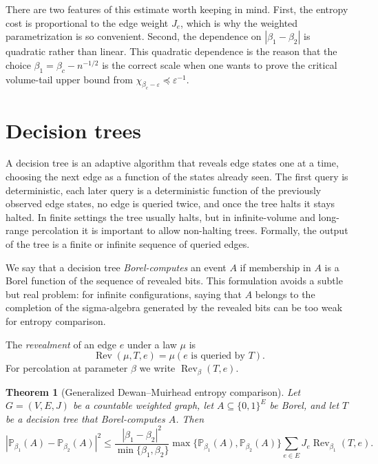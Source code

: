 \documentclass[11pt,reqno]{book}
\numberwithin{equation}{chapter}
\theoremstyle{plain}
\newtheorem{theorem}{Theorem}[chapter]
\theoremstyle{definition}
\theoremstyle{remark}
\renewcommand{\P}{\mathbb P}
\newcommand{\eps}{\varepsilon}
\newcommand{\1}{\mathbf 1}
\begin{document}
There are two features of this estimate worth keeping in mind. First, the entropy cost is proportional to the edge weight \(J_e\), which is why the weighted parametrization is so convenient. Second, the dependence on \(|\beta_1-\beta_2|\) is quadratic rather than linear. This quadratic dependence is the reason that the choice \(\beta_1=\beta_c-n^{-1/2}\) is the correct scale when one wants to prove the critical volume-tail upper bound from \(\chi_{\beta_c-\eps}\preceq \eps^{-1}\).

\section{Decision trees}

A decision tree is an adaptive algorithm that reveals edge states one at a time, choosing the next edge as a function of the states already seen. The first query is deterministic, each later query is a deterministic function of the previously observed edge states, no edge is queried twice, and once the tree halts it stays halted. In finite settings the tree usually halts, but in infinite-volume and long-range percolation it is important to allow non-halting trees. Formally, the output of the tree is a finite or infinite sequence of queried edges.

We say that a decision tree \emph{Borel-computes} an event $A$ if membership in $A$ is a Borel function of the sequence of revealed bits. This formulation avoids a subtle but real problem: for infinite configurations, saying that $A$ belongs to the completion of the sigma-algebra generated by the revealed bits can be too weak for entropy comparison.

The \emph{revealment} of an edge $e$ under a law $\mu$ is
\[
  \operatorname{Rev}(\mu,T,e)
  =
  \mu(e\text{ is queried by }T).
\]
For percolation at parameter $\beta$ we write $\operatorname{Rev}_\beta(T,e)$.

\begin{theorem}[Generalized Dewan--Muirhead entropy comparison]
Let $G=(V,E,J)$ be a countable weighted graph, let $A\subseteq\{0,1\}^E$ be Borel, and let $T$ be a decision tree that Borel-computes $A$. Then
\[
  |\P_{\beta_1}(A)-\P_{\beta_2}(A)|^2
  \leq
  \frac{|\beta_1-\beta_2|^2}{\min\{\beta_1,\beta_2\}}
  \max\{\P_{\beta_1}(A),\P_{\beta_2}(A)\}
  \sum_{e\in E}J_e\operatorname{Rev}_{\beta_1}(T,e).
\]
\end{theorem}
\end{document}
